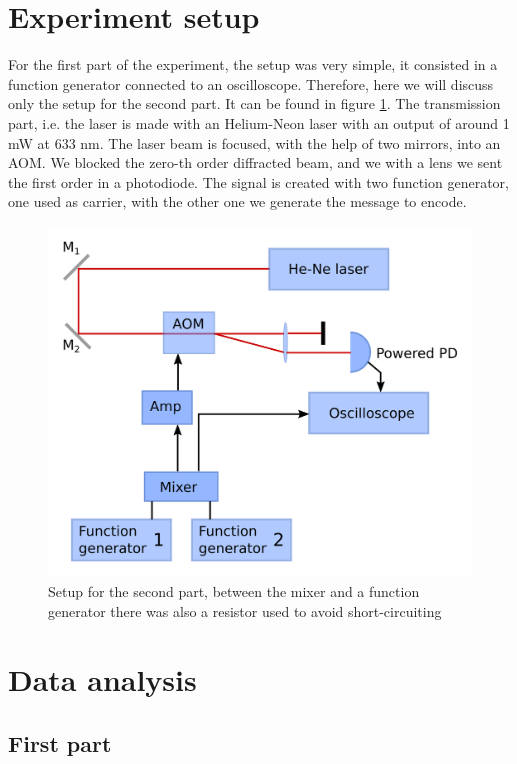 \documentclass[a4paper,10pt]{article}
\begin{document}
\section{Experiment setup}
For the first part of the experiment, the setup was very simple, it consisted in a function generator connected to an oscilloscope. Therefore, here we will discuss only the setup for the second part. It can be found in figure \ref{setup}. The transmission part, i.e. the laser is made with an Helium-Neon laser with an output of around 1 mW at 633 nm. The laser beam is focused, with the help of two mirrors, into an AOM. We blocked the zero-th order diffracted beam, and we with a lens we sent the first order in a photodiode. The signal is created with two function generator, one used as carrier, with the other one we generate the message to encode.
\begin{figure}[H]
\centering
\includegraphics[width=.8\textwidth]{setup}
\caption{Setup for the second part, between the mixer and a function generator there was also a resistor used to avoid short-circuiting}\label{setup}
\end{figure}
\section{Data analysis}
\subsection{First part}
\end{document}
